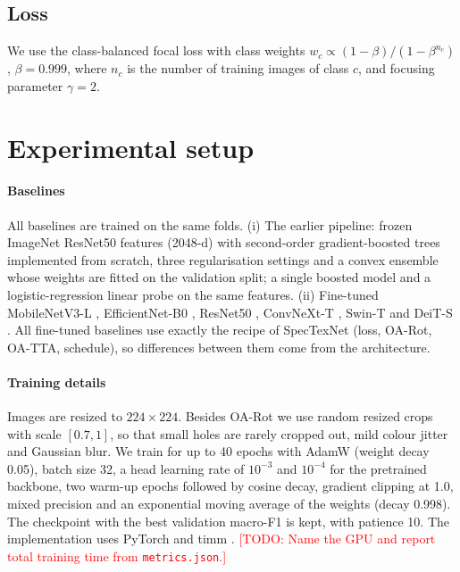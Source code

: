 \documentclass[preprint,12pt,authoryear]{elsarticle}
\newcommand{\todo}[1]{\textcolor{red}{[TODO: #1]}}
\begin{document}
\subsection{Loss}
We use the class-balanced focal loss \citep{cui2019cb,lin2017focal} with class weights
$w_c\propto(1-\beta)/(1-\beta^{n_c})$, $\beta=0.999$, where $n_c$ is the number of training images of
class $c$, and focusing parameter $\gamma=2$.

\section{Experimental setup}
\label{sec:setup}

\paragraph{Baselines}
All baselines are trained on the same folds. (i) The earlier pipeline: frozen ImageNet ResNet50
features (2048-d) with second-order gradient-boosted trees implemented from scratch, three
regularisation settings and a convex ensemble whose weights are fitted on the validation split; a
single boosted model and a logistic-regression linear probe on the same features. (ii) Fine-tuned
MobileNetV3-L \citep{howard2019mobilenetv3}, EfficientNet-B0 \citep{tan2019efficientnet}, ResNet50
\citep{he2016resnet}, ConvNeXt-T \citep{liu2022convnext}, Swin-T \citep{liu2021swin} and DeiT-S
\citep{touvron2021deit}. All fine-tuned baselines use exactly the recipe of SpecTexNet (loss,
OA-Rot, OA-TTA, schedule), so differences between them come from the architecture.

\paragraph{Training details}
Images are resized to $224\times224$. Besides OA-Rot we use random resized crops with scale
$[0.7,1]$, so that small holes are rarely cropped out, mild colour jitter and Gaussian blur. We train
for up to 40 epochs with AdamW \citep{loshchilov2019adamw} (weight decay 0.05), batch size 32, a
head learning rate of $10^{-3}$ and $10^{-4}$ for the pretrained backbone, two warm-up epochs
followed by cosine decay, gradient clipping at 1.0, mixed precision and an exponential moving average
of the weights (decay 0.998). The checkpoint with the best validation macro-F1 is kept, with
patience 10. The implementation uses PyTorch \citep{paszke2019pytorch} and timm
\citep{wightman2019timm}. \todo{Name the GPU and report total training time from
\texttt{metrics.json}.}
\end{document}
